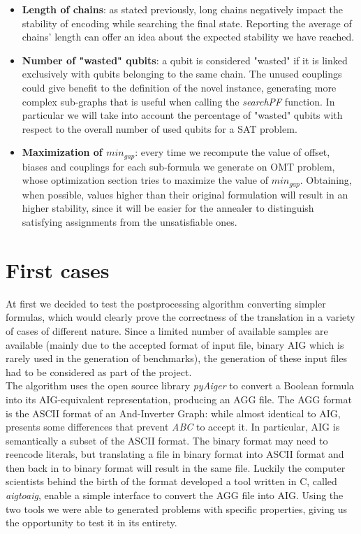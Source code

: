 \begin{itemize}
    \item \textbf{Length of chains}: as stated previously, long chains negatively impact the stability of encoding while searching the final state. Reporting the average of chains' length can offer an idea about the expected stability we have reached.
    \item \textbf{Number of "wasted" qubits}: a qubit is considered "wasted" if it is linked exclusively with qubits belonging to the same chain. The unused couplings could give benefit to the definition of the novel instance, generating more complex sub-graphs that is useful when calling the \textit{searchPF} function. In particular we will take into account the percentage of "wasted" qubits with respect to the overall number of used qubits for a SAT problem.
    \item \textbf{Maximization of $min_{gap}$}: every time we recompute the value of offset, biases and couplings for each sub-formula we generate on OMT problem, whose optimization section tries to maximize the value of $min_{gap}$. Obtaining, when possible, values higher than their original formulation will result in an higher stability, since it will be easier for the annealer to distinguish satisfying assignments from the unsatisfiable ones.
\end{itemize}

\pagebreak

\section{First cases}

At first we decided to test the postprocessing algorithm converting simpler formulas, which would clearly prove the correctness of the translation in a variety of cases of different nature. Since a limited number of available samples are available (mainly due to the accepted format of input file, binary AIG which is rarely used in the generation of benchmarks), the generation of these input files had to be considered as part of the project. \\
The algorithm uses the open source library \textit{pyAiger} \cite{pyaiger} to convert a Boolean formula into its AIG-equivalent representation, producing an AGG file. The AGG format is the ASCII format of an And-Inverter Graph: while almost identical to AIG, presents some differences that prevent \textit{ABC} to accept it. In particular, AIG is semantically a subset of the ASCII format. The binary format may need to reencode literals, but translating a file in binary format into ASCII format and   then back in to binary format will result in the same file. Luckily the computer scientists behind the birth of the format developed a tool written in C, called \textit{aigtoaig}, enable a simple interface to convert the AGG file into AIG. Using the two tools we were able to generated problems with specific properties, giving us the opportunity to test it in its entirety. 

